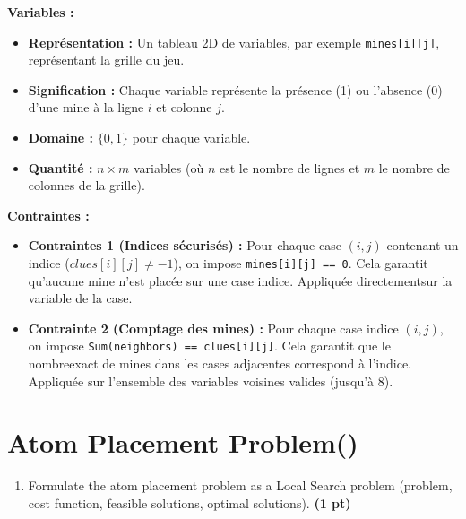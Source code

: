 \documentclass[11pt,a4paper]{report}
\begin{document}
\begin{answers}[10cm]
\textbf{Variables :}
\begin{itemize}
    \item \textbf{Représentation :} Un tableau 2D de variables, par exemple \texttt{mines[i][j]},  représentant la grille du jeu.
    \item \textbf{Signification :} Chaque variable représente la présence (1) ou l'absence (0) d'une mine à la ligne $i$ et colonne $j$.
    \item \textbf{Domaine :} $\{0, 1\}$ pour chaque variable.
    \item \textbf{Quantité :} $n \times m$ variables (où $n$  est le nombre de lignes et $m$ le nombre de colonnes de la grille).
\end{itemize}
\textbf{Contraintes :}
\begin{itemize}
    \item \textbf{Contraintes 1 (Indices sécurisés) :} Pour chaque case $(i,j)$ contenant un indice  ($clues[i][j] \neq -1$), on impose \texttt{mines[i][j] == 0}. Cela garantit qu'aucune mine n'est placée sur une case indice. Appliquée directementsur la variable de la case.
    \item \textbf{Contrainte 2 (Comptage des mines) :} Pour chaque case indice $(i,j)$, on impose \texttt{Sum(neighbors) == clues[i][j]}. Cela garantit que le nombreexact de mines dans les cases adjacentes correspond à l'indice. Appliquée sur l'ensemble des variables voisines valides (jusqu'à 8).
\end{itemize}
\end{answers}




\newpage
\section{Atom Placement Problem()}
\begin{enumerate}
\item Formulate the atom placement problem as a Local Search problem (problem, cost function, feasible solutions, optimal solutions). \textbf{(1 pt)}
\end{enumerate}

\begin{answers}[6cm]
\end{answers}
\end{document}
